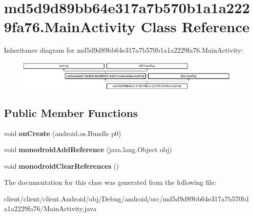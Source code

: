 \hypertarget{classmd5d9d89bb64e317a7b570b1a1a2229fa76_1_1MainActivity}{}\section{md5d9d89bb64e317a7b570b1a1a2229fa76.\+Main\+Activity Class Reference}
\label{classmd5d9d89bb64e317a7b570b1a1a2229fa76_1_1MainActivity}
Inheritance diagram for md5d9d89bb64e317a7b570b1a1a2229fa76.\+Main\+Activity\+:\begin{figure}[H]
\begin{center}
\leavevmode
\includegraphics[height=1.481482cm]{classmd5d9d89bb64e317a7b570b1a1a2229fa76_1_1MainActivity}
\end{center}
\end{figure}
\subsection*{Public Member Functions}
\begin{DoxyCompactItemize}
\item 
\hypertarget{classmd5d9d89bb64e317a7b570b1a1a2229fa76_1_1MainActivity_a852deb879edc007aa4904a7e915c452a}{}void {\bfseries on\+Create} (android.\+os.\+Bundle p0)\label{classmd5d9d89bb64e317a7b570b1a1a2229fa76_1_1MainActivity_a852deb879edc007aa4904a7e915c452a}

\item 
\hypertarget{classmd5d9d89bb64e317a7b570b1a1a2229fa76_1_1MainActivity_af2de5cd34c21ca9fc85069c2b8ec090a}{}void {\bfseries monodroid\+Add\+Reference} (java.\+lang.\+Object obj)\label{classmd5d9d89bb64e317a7b570b1a1a2229fa76_1_1MainActivity_af2de5cd34c21ca9fc85069c2b8ec090a}

\item 
\hypertarget{classmd5d9d89bb64e317a7b570b1a1a2229fa76_1_1MainActivity_a8f10b268518f8ae9b9f4f671a4e374ca}{}void {\bfseries monodroid\+Clear\+References} ()\label{classmd5d9d89bb64e317a7b570b1a1a2229fa76_1_1MainActivity_a8f10b268518f8ae9b9f4f671a4e374ca}

\end{DoxyCompactItemize}


The documentation for this class was generated from the following file\+:\begin{DoxyCompactItemize}
\item 
client/client/client.\+Android/obj/\+Debug/android/src/md5d9d89bb64e317a7b570b1a1a2229fa76/Main\+Activity.\+java\end{DoxyCompactItemize}
